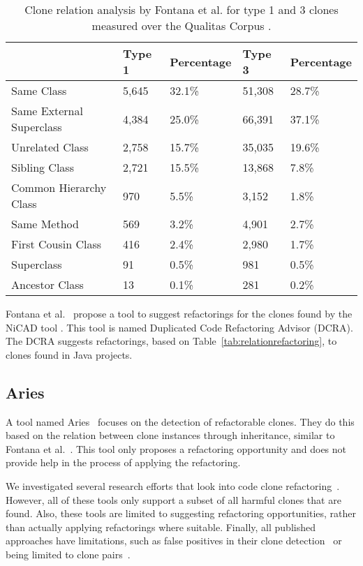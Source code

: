 \begin{table}[H]
\centering
\begin{tabular}{@{}lllll@{}}
\toprule
                         & Type 1 & Percentage & Type 3 & Percentage \\ \midrule
Same Class               & 5,645  & 32.1\%     & 51,308 & 28.7\%     \\
Same External Superclass & 4,384  & 25.0\%     & 66,391 & 37.1\%     \\
Unrelated Class          & 2,758  & 15.7\%     & 35,035 & 19.6\%     \\
Sibling Class            & 2,721  & 15.5\%     & 13,868 & 7.8\%      \\
Common Hierarchy Class   & 970    & 5.5\%      & 3,152  & 1.8\%      \\
Same Method              & 569    & 3.2\%      & 4,901  & 2.7\%      \\
First Cousin Class       & 416    & 2.4\%      & 2,980  & 1.7\%      \\
Superclass               & 91     & 0.5\%      & 981    & 0.5\%      \\
Ancestor Class           & 13     & 0.1\%      & 281    & 0.2\%      \\ \bottomrule
\end{tabular}
\caption{Clone relation analysis by Fontana et al. \cite{fontana2012duplicated} for type 1 and 3 clones measured over the Qualitas Corpus \cite{tempero2010qualitas}.}
\label{tab:dcra-relation}
\end{table}

Fontana et al.~\cite{fontana2012duplicated, fontana2015duplicated} propose a tool to suggest refactorings for the clones found by the NiCAD tool \cite{roy2008nicad, cordy2011nicad}. This tool is named Duplicated Code Refactoring Advisor (DCRA). The DCRA suggests refactorings, based on Table~\ref{tab:relationrefactoring}, to clones found in Java projects.

\subsection{Aries}
A tool named Aries~\cite{higo2004aries, higo2008metric} focuses on the detection of refactorable clones. They do this based on the relation between clone instances through inheritance, similar to Fontana et al.~\cite{fontana2012duplicated}. This tool only proposes a refactoring opportunity and does not provide help in the process of applying the refactoring.

We investigated several research efforts that look into code clone refactoring~\cite{alwaqfi2017refactoring, chen2018clone, koni2001scenario}. However, all of these tools only support a subset of all harmful clones that are found. Also, these tools are limited to suggesting refactoring opportunities, rather than actually applying refactorings where suitable. Finally, all published approaches have limitations, such as false positives in their clone detection~\cite{chen2018clone} or being limited to clone pairs~\cite{higo2008metric}.
